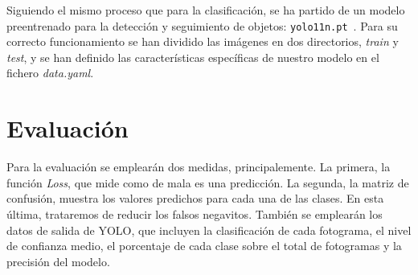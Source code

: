 \documentclass[12pt]{report} %
\begin{document}
    Siguiendo el mismo proceso que para la clasificación, se ha partido de un modelo preentrenado para la detección y seguimiento de objetos: \texttt{yolo11n.pt}~\cite{YOLODetect}. Para su correcto funcionamiento se han dividido las imágenes en dos directorios, \textit{train} y \textit{test}, y se han definido las características específicas de nuestro modelo en el fichero \textit{data.yaml}. 

    

    \section{Evaluación}

    Para la evaluación se emplearán dos medidas, principalemente. La primera,
    la función \textit{Loss}, que mide como de mala es una predicción. La
    segunda, la matriz de confusión, muestra los valores predichos para cada
    una de las clases. En esta última, trataremos de reducir los falsos
    negavitos. También se emplearán los datos de salida de YOLO, que incluyen
    la clasificación de cada fotograma, el nivel de confianza medio, el
    porcentaje de cada clase sobre el total de fotogramas y la precisión del
    modelo.
\end{document}
